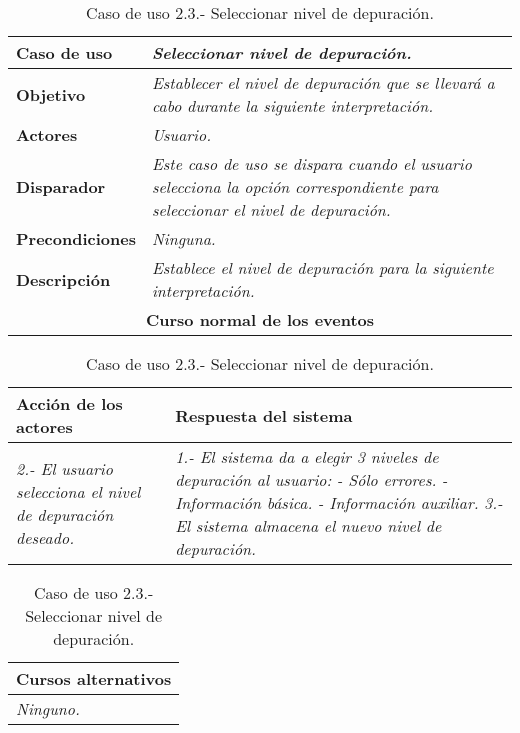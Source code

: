    \begin{table}[!ht] %
      \centering
      \begin{tabular}{|p{4cm}|p{11.5cm}|}
      \hline
      \textbf{Caso de uso} & \textit{Seleccionar nivel de depuración.}\\ \hline 
      \textbf{Objetivo} & \textit{Establecer el nivel de depuración que se llevará a cabo durante la siguiente interpretación.}\\ \hline
      \textbf{Actores} & \textit{Usuario.}\\ \hline
      \textbf{Disparador} & \textit{Este caso de uso se dispara cuando el usuario selecciona la opción correspondiente para seleccionar el nivel de
            depuración.}\\ \hline
      \textbf{Precondiciones} & \textit{Ninguna.}\\ \hline
      \textbf{Descripción} & \textit{Establece el nivel de depuración para la siguiente interpretación.}\\ \hline
      \multicolumn{2}{|c|}{\textbf{Curso normal de los eventos}}\\ \hline
    \end{tabular}
    \begin{tabular}{|p{7.75cm}|p{7.75cm}|}
      \hspace{2cm}\textbf{Acción de los actores} & \hspace{1.75cm}\textbf{Respuesta del sistema}\\ \hline
      \textit{2.- El usuario selecciona el nivel de depuración deseado.} & \textit{1.- El sistema da a elegir 3 niveles de depuración al usuario:}
            \textit{  - Sólo errores.} \textit{  - Información básica.} \textit{  - Información auxiliar.} \textit{3.- El sistema almacena el 
            nuevo nivel de depuración.} \\ \hline
    \end{tabular}
    \begin{tabular}{|p{15.9cm}|}
      \hspace{6cm}\textbf{Cursos alternativos}\\ \hline     
      \textit{Ninguno.} \\ \hline
    \end{tabular}
    \caption{Caso de uso 2.3.- Seleccionar nivel de depuración.}
   \end{table}


